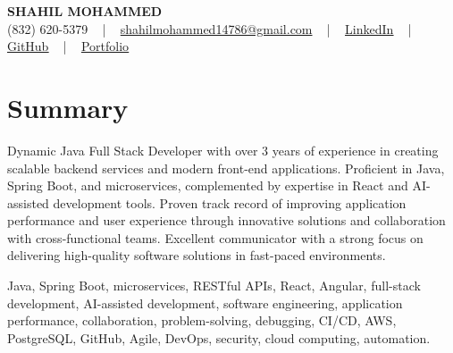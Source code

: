 \documentclass[letterpaper,10pt]{article}
\begin{document}
\begin{center}
    {\fontsize{14pt}{12pt}\selectfont \textbf{\MakeUppercase{Shahil Mohammed}}}\\ \vspace{2pt}
    \fontsize{10pt}{12pt}\selectfont (832) 620-5379 ~ | ~ \href{mailto:shahilmohammed14786@gmail.com}{shahilmohammed14786@gmail.com} ~ | ~  
    \href{https://www.linkedin.com/in/shahil-mohammed-9652931a1/}{\color{blue}\underline{LinkedIn}}  ~ | ~ 
    \href{https://github.com/freakbeast14}{\color{blue}\underline{GitHub}} ~ | ~ 
    \href{https://shahil-mohammed.netlify.app/}{\color{blue}\underline{Portfolio}}
    \vspace{-8pt}
\end{center}

\section{Summary}
\vspace{-2pt}\fontsize{8pt}{9pt}\selectfont
Dynamic Java Full Stack Developer with over 3 years of experience in creating scalable backend services and modern front-end applications. Proficient in Java, Spring Boot, and microservices, complemented by expertise in React and AI-assisted development tools. Proven track record of improving application performance and user experience through innovative solutions and collaboration with cross-functional teams. Excellent communicator with a strong focus on delivering high-quality software solutions in fast-paced environments.
 \vspace{-5pt}
 
{\fontsize{1pt}{1pt}\selectfont\color{white}
Java, Spring Boot, microservices, RESTful APIs, React, Angular, full-stack development, AI-assisted development, software engineering, application performance, collaboration, problem-solving, debugging, CI/CD, AWS, PostgreSQL, GitHub, Agile, DevOps, security, cloud computing, automation.
}
\vspace{-8pt}

\vspace{-2pt}
\end{document}
